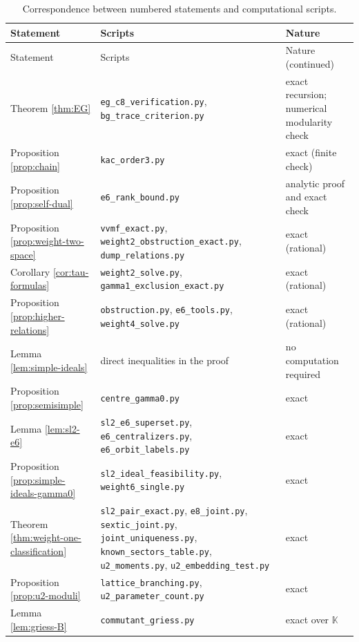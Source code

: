 \documentclass[leqno]{article}
\newcommand{\K}{\ensuremath{\mathbb{K}}}
\numberwithin{equation}{section}
\begin{document}
\begingroup
\small
\begin{longtable}{>{\raggedright\arraybackslash}p{3.6cm}>{\raggedright\arraybackslash}p{6.2cm}>{\raggedright\arraybackslash}p{3.3cm}}
\caption{Correspondence between numbered statements and computational scripts.}
\label{tab:scripts-statements}\\
\hline
Statement & Scripts & Nature \\
\hline
\endfirsthead
\hline
Statement & Scripts & Nature (continued) \\
\hline
\endhead
Theorem \ref{thm:EG} & \texttt{eg\_c8\_verification.py}, \texttt{bg\_trace\_criterion.py} & exact recursion; numerical modularity check \\
Proposition \ref{prop:chain} & \texttt{kac\_order3.py} & exact (finite check) \\
Proposition \ref{prop:self-dual} & \texttt{e6\_rank\_bound.py} & analytic proof and exact check \\
Proposition \ref{prop:weight-two-space} & \texttt{vvmf\_exact.py}, \texttt{weight2\_obstruction\_exact.py}, \texttt{dump\_relations.py} & exact (rational) \\
Corollary \ref{cor:tau-formulas} & \texttt{weight2\_solve.py}, \texttt{gamma1\_exclusion\_exact.py} & exact (rational) \\
Proposition \ref{prop:higher-relations} & \texttt{obstruction.py}, \texttt{e6\_tools.py}, \texttt{weight4\_solve.py} & exact (rational) \\
Lemma \ref{lem:simple-ideals} & direct inequalities in the proof & no computation required \\
Proposition \ref{prop:semisimple} & \texttt{centre\_gamma0.py} & exact \\
Lemma \ref{lem:sl2-e6} & \texttt{sl2\_e6\_superset.py}, \texttt{e6\_centralizers.py}, \texttt{e6\_orbit\_labels.py} & exact \\
Proposition \ref{prop:simple-ideals-gamma0} & \texttt{sl2\_ideal\_feasibility.py}, \texttt{weight6\_single.py} & exact \\
Theorem \ref{thm:weight-one-classification} & \texttt{sl2\_pair\_exact.py}, \texttt{e8\_joint.py}, \texttt{sextic\_joint.py}, \texttt{joint\_uniqueness.py}, \texttt{known\_sectors\_table.py}, \texttt{u2\_moments.py}, \texttt{u2\_embedding\_test.py} & exact \\
Proposition \ref{prop:u2-moduli} & \texttt{lattice\_branching.py}, \texttt{u2\_parameter\_count.py} & exact \\
Lemma \ref{lem:griess-B} & \texttt{commutant\_griess.py} & exact over $\K$ \\

\end{longtable}
\end{document}
